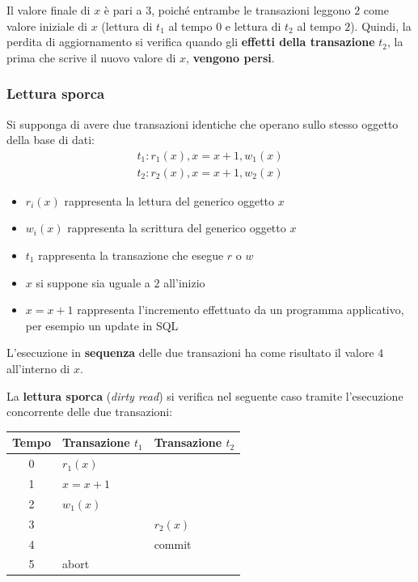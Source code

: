 \documentclass[a4paper]{article}
\begin{document}
	\noindent
	Il valore finale di $x$ è pari a $3$, poiché entrambe le transazioni leggono $2$ come valore iniziale di $x$ (lettura di $t_{1}$ al tempo $0$ e lettura di $t_{2}$ al tempo $2$). Quindi, la perdita di aggiornamento si verifica quando gli \textbf{effetti della transazione} $t_{2}$, la prima che scrive il nuovo valore di $x$, \textbf{vengono persi}.\newpage
	
	\subsubsection{Lettura sporca}\label{par: lettura sporca}
	
	Si supponga di avere due transazioni identiche che operano sullo stesso oggetto della base di dati:
	\begin{gather*}
		t_{1} : r_{1}\left(x\right), x = x + 1, w_{1}\left(x\right) \\
		t_{2} : r_{2}\left(x\right), x = x + 1, w_{2}\left(x\right)
	\end{gather*}
	\begin{itemize}
		\item $r_{i}\left(x\right)$ rappresenta la lettura del generico oggetto $x$
		\item $w_{i}\left(x\right)$ rappresenta la scrittura del generico oggetto $x$
		\item $t_{1}$ rappresenta la transazione che esegue $r$ o $w$
		\item $x$ si suppone sia uguale a $2$ all'inizio
		\item $x = x+1$ rappresenta l'incremento effettuato da un programma applicativo, per esempio un \textsf{update} in SQL
	\end{itemize}
	L'esecuzione in \textbf{sequenza} delle due transazioni ha come risultato il valore $4$ all'interno di $x$.\newline
	
	\noindent
	La \textcolor{Red3}{\textbf{lettura sporca}} (\emph{dirty read}) si verifica nel seguente caso tramite l'esecuzione concorrente delle due transazioni:
	\begin{table}[!htbp]
		\centering
		\begin{tabular}{@{} c l l @{}}
			\toprule
			Tempo & Transazione $t_{1}$ & Transazione $t_{2}$ \\
			\midrule
			0	& $r_{1}\left(x\right)$			& \\
			1	& $x = x + 1$					& \\
			2	& $w_{1}\left(x\right)$			& \\
			3	&								& $r_{2}\left(x\right)$ \\
			4	&								& \textsf{commit} \\
			5	& \textsf{abort}				& \\
			\bottomrule
		\end{tabular}
	\end{table}
	
\end{document}
